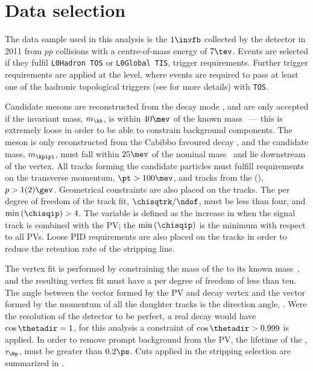 \section{Data selection}
\label{sec:dsphi:sel}

%
%
%
%
%
%


The data sample used in this analysis is the
$1\invfb$ collected by the \lhcb detector in 2011 from $pp$
collisions with a centre-of-mass energy of $7\tev$.
Events are selected if they fulfil {\tt L0Hadron TOS} or {\tt L0Global TIS}, trigger requirements.
Further trigger requirements are applied at the \hlttwo level, where events are required to pass at
least one of the hadronic topological triggers (see  for more details) with {\tt TOS}.

Candidate \phii mesons are reconstructed from the decay mode \phitokk, and are only accepted if the
invariant \kk mass, $m_\kk$, is within $40\mev$ of the known \phii mass~\cite{PDG2012}
--- this is extremely loose in order to be able to constrain background components.
The \Ds meson is only reconstructed from the Cabibbo favoured decay \dstokkpi, and the candidate
mass, $m_\kpipi$, must fall within $25\mev$ of the nominal \Ds mass~\cite{PDG2012} and lie
downstream of the \Bp vertex.
All tracks forming the candidate particles must fulfill requirements on the transverse momentum,
$\pt>100\mev$, and tracks from the \Ds(\phii), $p>1(2)\gev$.
Geometrical constraints are also placed on the tracks.
The \chisq per degree of freedom of the track fit, $\chisqtrk/\ndof$, must be less than four, and
$\min\left(\chisqip\right)>4$.
The variable \chisqip is defined as the increase in \chisqvtx when the signal track is combined
with the PV; the $\min\left(\chisqip\right)$ is the minimum \chisqip with respect to all PVs.
Loose PID requirements are also placed on the tracks in order to reduce the retention rate of the
stripping line.

The \Bp vertex fit is performed by constraining the mass of the \Ds to its known
mass~\cite{PDG2012}, and the resulting vertex fit must have a \chisqvtx per degree of freedom of
less than ten.
The angle between the vector formed by the PV and \Bp decay vertex and the vector formed by the
momentum of all the daughter tracks is the direction angle, \thetadir.
Were the resolution of the \lhcb detector to be perfect, a real decay would have $\cos\thetadir=1$,
for this analysis a constraint of $\cos\thetadir>0.999$ is applied.
In order to remove prompt background from the PV, the lifetime of the \Bp, $\tau_{\Bp}$, must be
greater than $0.2\ps$.
Cuts applied in the stripping selection are summarized in .



